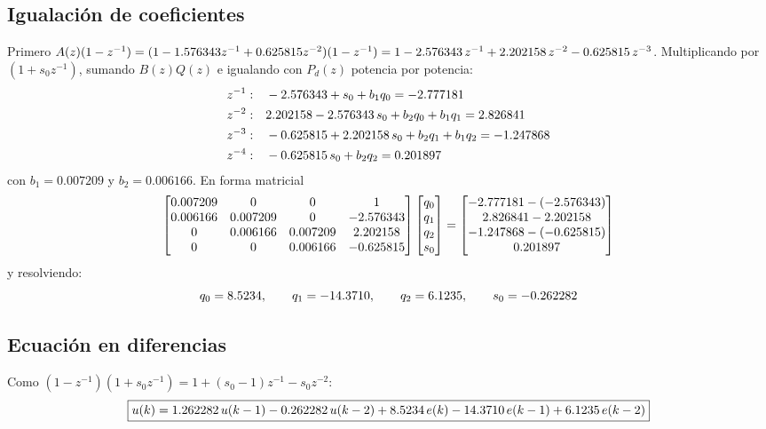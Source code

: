 \documentclass[11pt,letterpaper]{article}
\begin{document}
\subsection{Igualación de coeficientes}
Primero
$A(z)(1-z^{-1}) = (1 - 1.576343z^{-1} + 0.625815z^{-2})(1 - z^{-1})
= 1 -2.576343\,z^{-1} + 2.202158\,z^{-2} -0.625815\,z^{-3}$.
Multiplicando por $(1+s_0z^{-1})$, sumando $B(z)Q(z)$ e igualando con
$P_d(z)$ potencia por potencia:
\begin{align}
  z^{-1}:&\quad -2.576343 + s_0 + b_1 q_0 = -2.777181\\
  z^{-2}:&\quad 2.202158 -2.576343\,s_0 + b_2 q_0 + b_1 q_1 = 2.826841\\
  z^{-3}:&\quad -0.625815 + 2.202158\,s_0 + b_2 q_1 + b_1 q_2 = -1.247868\\
  z^{-4}:&\quad -0.625815\,s_0 + b_2 q_2 = 0.201897
\end{align}
con $b_1 = 0.007209$ y $b_2 = 0.006166$. En forma matricial
\begin{equation}
\begin{bmatrix}
 0.007209 & 0 & 0 & 1\\
 0.006166 & 0.007209 & 0 & -2.576343\\
 0 & 0.006166 & 0.007209 & 2.202158\\
 0 & 0 & 0.006166 & -0.625815
\end{bmatrix}
\begin{bmatrix} q_0\\ q_1\\ q_2\\ s_0 \end{bmatrix}
=
\begin{bmatrix} -2.777181 - (-2.576343)\\ 2.826841 - 2.202158\\ -1.247868 - (-0.625815)\\ 0.201897 \end{bmatrix}
\end{equation}
y resolviendo:
\begin{equation}
  q_0 = 8.5234,\qquad q_1 = -14.3710,\qquad q_2 = 6.1235,\qquad s_0 = -0.262282
\end{equation}

\subsection{Ecuación en diferencias}
Como $(1 - z^{-1})(1 + s_0z^{-1}) = 1 + (s_0 - 1)z^{-1} - s_0 z^{-2}$:
\begin{equation}
  \boxed{u(k) = 1.262282\,u(k-1) -0.262282\,u(k-2) + 8.5234\,e(k) -14.3710\,e(k-1) + 6.1235\,e(k-2)}
\end{equation}
\end{document}
